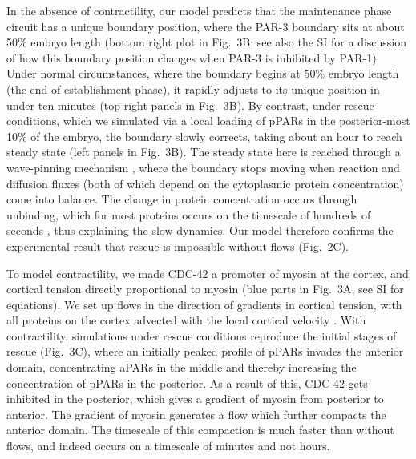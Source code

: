 \documentclass[11pt]{article}
\newcommand{\6}[1]{#1_{\text{6}}}
\newcommand{\3}[1]{#1_{\text{3}}}
\begin{document}
In the absence of contractility, our model predicts that the maintenance phase circuit has a unique boundary position, where the PAR-3 boundary sits at about 50\% embryo length (bottom right plot in Fig.\ 3B; see also the SI for a discussion of how this boundary position changes when PAR-3 is inhibited by PAR-1). Under normal circumstances, where the boundary begins at 50\% embryo length (the end of establishment phase), it rapidly adjusts to its unique position in under ten minutes (top right panels in Fig.\ 3B). By contrast, under rescue conditions, which we simulated via a local loading of pPARs in the posterior-most 10\% of the embryo, the boundary slowly corrects, taking about an hour to reach steady state (left panels in Fig.\ 3B). The steady state here is reached through a wave-pinning mechanism \citep{mori2008wave, goehring2011polarization}, where the boundary stops moving when reaction and diffusion fluxes (both of which depend on the cytoplasmic protein concentration) come into balance. The change in protein concentration occurs through unbinding, which for most proteins occurs on the timescale of hundreds of seconds \citep{robin2014single}, thus explaining the slow dynamics. Our model therefore confirms the experimental result that rescue is impossible without flows (Fig.\ 2C).

To model contractility, we made CDC-42 a promoter of myosin at the cortex, and cortical tension directly proportional to myosin (blue parts in Fig.\ 3A, see SI for equations). We set up flows in the direction of gradients in cortical tension, with all proteins on the cortex advected with the local cortical velocity \citep{illukkumbura2023design}. With contractility, simulations under rescue conditions reproduce the initial stages of rescue (Fig.\ 3C), where an initially peaked profile of pPARs invades the anterior domain, concentrating aPARs in the middle and thereby increasing the concentration of pPARs in the posterior. As a result of this, CDC-42 gets inhibited in the posterior, which gives a gradient of myosin from posterior to anterior. The gradient of myosin generates a flow which further compacts the anterior domain. The timescale of this compaction is much faster than without flows, and indeed occurs on a timescale of minutes and not hours.
\end{document}
